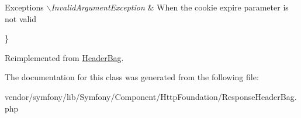 \begin{DoxyExceptions}{\-Exceptions}
{\em $\backslash$\-Invalid\-Argument\-Exception} & \-When the cookie expire parameter is not valid\\
\hline
\end{DoxyExceptions}
\} 

\-Reimplemented from \hyperlink{class_symfony_1_1_component_1_1_http_foundation_1_1_header_bag_a645f6c034cd6799b47bef2bc43e7056f}{\-Header\-Bag}.



\-The documentation for this class was generated from the following file\-:\begin{DoxyCompactItemize}
\item 
vendor/symfony/lib/\-Symfony/\-Component/\-Http\-Foundation/\-Response\-Header\-Bag.\-php\end{DoxyCompactItemize}
